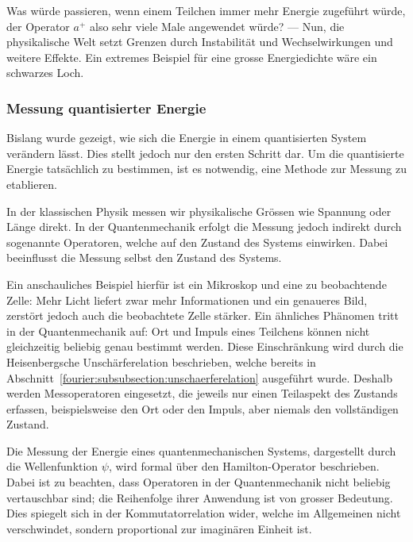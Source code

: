 			Was würde passieren, wenn einem Teilchen immer mehr Energie zugeführt würde, der Operator $a^+$ also sehr viele Male angewendet würde? ---
			Nun, die physikalische Welt setzt Grenzen durch Instabilität und Wechselwirkungen und weitere Effekte.
			Ein extremes Beispiel für eine grosse Energiedichte wäre ein schwarzes Loch.
		
		\subsubsection{Messung quantisierter Energie\label{fourier:subsubsection:MessungQuantisierterEnergie}}
			Bislang wurde gezeigt, wie sich die Energie in einem quantisierten System verändern lässt.
			Dies stellt jedoch nur den ersten Schritt dar.
			Um die quantisierte Energie tatsächlich zu bestimmen, ist es notwendig, eine Methode zur Messung zu etablieren.

			In der klassischen Physik messen wir physikalische Grössen wie Spannung oder Länge direkt.
			In der Quantenmechanik erfolgt die Messung jedoch indirekt durch sogenannte Operatoren, welche auf den Zustand des Systems einwirken.
			Dabei beeinflusst die Messung selbst den Zustand des Systems.

			Ein anschauliches Beispiel hierfür ist ein Mikroskop und eine zu beobachtende Zelle:
			Mehr Licht liefert zwar mehr Informationen und ein genaueres Bild, zerstört jedoch auch die beobachtete Zelle stärker.
			Ein ähnliches Phänomen tritt in der Quantenmechanik auf:
			Ort und Impuls eines Teilchens können nicht gleichzeitig beliebig genau bestimmt werden.
			Diese Einschränkung wird durch die Heisenbergsche Unschärferelation beschrieben, welche bereits in Abschnitt~\ref{fourier:subsubsection:unschaerferelation} ausgeführt wurde.
			Deshalb werden Messoperatoren eingesetzt, die jeweils nur einen Teilaspekt des Zustands erfassen, beispielsweise den Ort oder den Impuls, aber niemals den vollständigen Zustand.

			Die Messung der Energie eines quantenmechanischen Systems, dargestellt durch die Wellenfunktion $\psi$, wird formal über den Hamilton-Operator beschrieben.
			Dabei ist zu beachten, dass Operatoren in der Quantenmechanik nicht beliebig vertauschbar sind; die Reihenfolge ihrer Anwendung ist von grosser Bedeutung.
			Dies spiegelt sich in der Kommutatorrelation wider, welche im Allgemeinen nicht verschwindet, sondern proportional zur imaginären Einheit ist.

